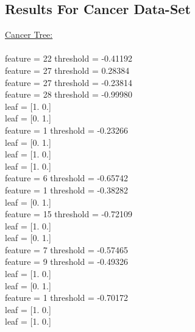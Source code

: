 \documentclass{article}
\begin{document}
\newpage
\subsection{Results For Cancer Data-Set}

\underline{\large{Cancer Tree:}}\\ \\
\hspace*{0pt}feature =  22  threshold =  -0.41192\\
\hspace*{15pt}feature =  27  threshold =  0.28384\\
\hspace*{25pt}feature =  27  threshold =  -0.23814\\
\hspace*{40pt} feature =  28  threshold =  -0.99980\\
\hspace*{55pt}leaf =  [1. 0.] \\
\hspace*{55pt}leaf =  [0. 1.] \\
\hspace*{40pt}feature =  1 threshold =  -0.23266\\
\hspace*{55pt}leaf =  [0. 1.] \\
\hspace*{55pt}leaf =  [1. 0.] \\
\hspace*{25pt}leaf =  [1. 0.]\\
\hspace*{15pt}feature =  6 threshold =  -0.65742\\
\hspace*{25pt}feature =  1 threshold =  -0.38282\\
\hspace*{40pt}leaf =  [0. 1.]\\
\hspace*{40pt} feature =  15 threshold =  -0.72109\\
\hspace*{55pt}leaf =  [1. 0.] \\
\hspace*{55pt}leaf =  [0. 1.] \\
\hspace*{25pt}feature =  7 threshold =  -0.57465\\
\hspace*{40pt} feature =  9 threshold =  -0.49326\\
\hspace*{55pt}leaf =  [1. 0.] \\
\hspace*{55pt}leaf =  [0. 1.] \\
\hspace*{40pt}feature =  1 threshold =  -0.70172\\
\hspace*{55pt}leaf =  [1. 0.] \\
\hspace*{55pt}leaf =  [1. 0.] \\
\end{document}

